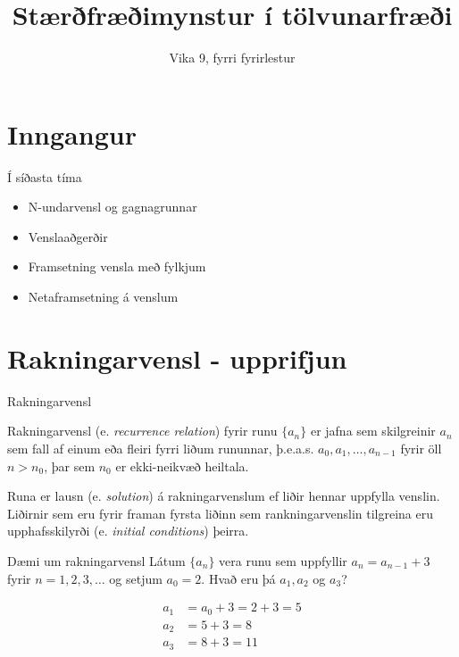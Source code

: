 \documentclass[handout]{beamer}
\title{Stærðfræðimynstur í tölvunarfræði}
\subtitle{Vika 9, fyrri fyrirlestur}
\begin{document}
\begin{frame}
\titlepage
\end{frame}


\section{Inngangur}

\begin{frame}{Í síðasta tíma}
    \begin{itemize}
        \item N-undarvensl og gagnagrunnar
        \item Venslaaðgerðir
        \item Framsetning vensla með fylkjum
        \item Netaframsetning á venslum
    \end{itemize}
\end{frame}

\section{Rakningarvensl - upprifjun}

\begin{frame}{Rakningarvensl}
\begin{tcolorbox}[title=Rakningarvensl]
Rakningarvensl (e. \emph{recurrence relation}) fyrir runu $\{a_n\}$ er jafna sem skilgreinir $a_n$ sem fall af einum eða fleiri fyrri liðum rununnar, þ.e.a.s. $a_0, a_1, \ldots, a_{n-1}$ fyrir öll $n > n_0$, þar sem $n_0$ er ekki-neikvæð heiltala.
\end{tcolorbox}
Runa er lausn (e. \emph{solution}) á rakningarvenslum ef liðir hennar uppfylla venslin. Liðirnir sem eru fyrir framan fyrsta liðinn sem rankningarvenslin tilgreina eru upphafsskilyrði (e. \emph{initial conditions}) þeirra.
\end{frame}

\begin{frame}{Dæmi um rakningarvensl}
Látum $\{a_n\}$ vera runu sem uppfyllir $a_n = a_{n-1} + 3$ fyrir $n=1, 2, 3, \ldots$ og setjum $a_0 = 2$. Hvað eru þá $a_1, a_2$ og $a_3$? \pause

\begin{align*}
a_1 &= a_0 + 3 = 2 + 3 = 5\\
a_2 &= 5 + 3 = 8\\
a_3 &= 8 + 3 = 11\\
\end{align*}

\end{frame}
\end{document}
